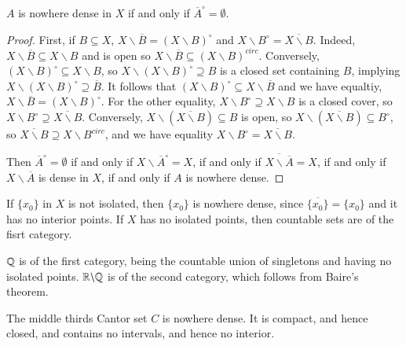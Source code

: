 \begin{lemma}
    $A$ is nowhere dense in $X$ if and only if $\overline{A}^{\circ} = \emptyset$.
\end{lemma}
\begin{proof}
    First, if $B \subseteq X$, $X\backslash \overline{B} = (X\backslash B)^{\circ}$ and $X\backslash B^{\circ} = \overline{X\backslash B}$. Indeed, $X\backslash \overline{B} \subseteq X\backslash B$ and is open so $X\backslash \overline{B} \subseteq (X\backslash B)^{circ}$. Conversely, $(X\backslash B)^{\circ} \subseteq X\backslash B$, so $X\backslash(X\backslash B)^{\circ} \supseteq B$ is a closed set containing $B$, implying $X\backslash(X\backslash B)^{\circ} \supseteq \overline{B}$. It follows that $(X\backslash B)^{\circ} \subseteq X\backslash\overline{B}$ and we have equaltiy, $X\backslash\overline{B} = (X\backslash B)^{\circ}$. For the other equality, $X\backslash B^{\circ} \supseteq X\backslash B$ is a closed cover, so $X\backslash B^{\circ} \supseteq \overline{X\backslash B}$. Conversely, $X\backslash (\overline{X\backslash B})\subseteq B$ is open, so $X\backslash(\overline{X\backslash B}) \subseteq B^{\circ}$, so $\overline{X\backslash B}\supseteq X\backslash B^{circ}$, and we have equality $X\backslash B^{\circ} = \overline{X\backslash B}$.


    Then $\overline{A}^{\circ} = \emptyset$ if and only if $X\backslash \overline{A}^{\circ} = X$, if and only if $\overline{X\backslash \overline{A}} = X$, if and only if $X\backslash\overline{A}$ is dense in $X$, if and only if $A$ is nowhere dense.
\end{proof}

\begin{example}
    If $\{x_0\}$ in $X$ is not isolated, then $\{x_0\}$ is nowhere dense, since $\overline{\{x_0\}} = \{x_0\}$ and it has no interior points. If $X$ has no isolated points, then countable sets are of the fisrt category.
\end{example}

\begin{example}
    $\mathbb Q$ is of the first category, being the countable union of singletons and having no isolated points. $\mathbb R\backslash\mathbb Q$ is of the second category, which follows from Baire's theorem.
\end{example}

\begin{example}
    The middle thirds Cantor set $C$ is nowhere dense. It is compact, and hence closed, and contains no intervals, and hence no interior.
\end{example}

